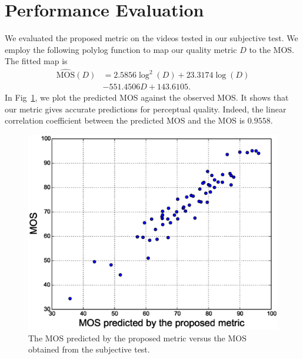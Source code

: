 \documentclass{sig-alternate}
\begin{document}
\section{Performance Evaluation}
\label{sec:experiment}
We evaluated the proposed metric on the videos tested in our subjective test. We employ the following polylog function to map our quality metric $D$ to the MOS. The fitted map is  
\begin{align*}
\label{eq:mos_mapping}
\mathrm{\hat{MOS}}(D) & = 2.5856\log^2(D) +23.3174\log(D) \\
&- 551.4506D + 143.6105.
\end{align*}
In Fig~\ref{fig:predicted_mos}, we plot the predicted MOS against the observed MOS. It shows that our metric gives accurate predictions for perceptual quality. Indeed, the linear correlation coefficient between the predicted MOS and the MOS is $0.9558$.

\begin{figure}
\includegraphics[width=\columnwidth]{img/preMos_Mos.eps}
\caption{\label{fig:predicted_mos}The MOS predicted by the proposed metric versus the MOS obtained from the subjective test.}
\end{figure}
\end{document}

